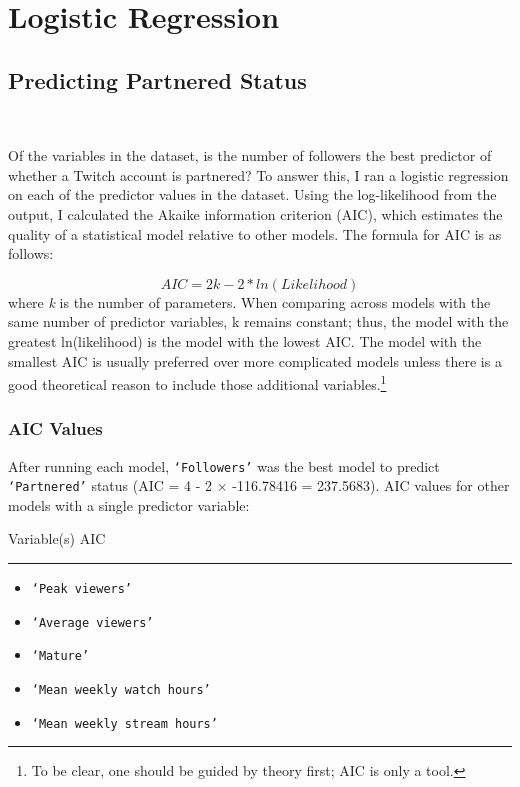 \documentclass[12pt]{article}
\begin{document}
\section{Logistic Regression}

\subsection{Predicting Partnered Status}\

Of the variables in the dataset, is the number of followers the best predictor of whether a Twitch account is partnered? To answer this, I ran a logistic regression on each of the predictor values in the dataset. Using the log-likelihood from the output, I calculated the Akaike information criterion (AIC), which estimates the quality of a statistical model relative to other models. The formula for AIC is as follows:

\begin{equation}
AIC = 2k -2 \ast ln(Likelihood)
\end{equation}
where \emph{k} is the number of parameters. When comparing across models with the same number of predictor variables, k remains constant; thus, the model with the greatest ln(likelihood) is the model with the lowest AIC. The model with the smallest AIC is usually preferred over more complicated models unless there is a good theoretical reason to include those additional variables.\footnote{To be clear, one should be guided by theory first; AIC is only a tool.}

\subsubsection{AIC Values}

After running each model, \texttt{`Followers'} was the best model to predict \texttt{`Partnered'} status (AIC = 4 - 2 $\times$ -116.78416 = 237.5683).
\newline
\newline
\noindent AIC values for other models with a single predictor variable:

\noindent Variable(s) \hfill AIC 
\hspace{0.4em}
\hrule
\begin{itemize}
	\item \texttt{`Peak viewers'} 
	\item \texttt{`Average viewers'} 
	\item \texttt{`Mature'} 
	\item \texttt{`Mean weekly watch hours'} 
	\item \texttt{`Mean weekly stream hours'} 
\end{itemize}
\end{document}

